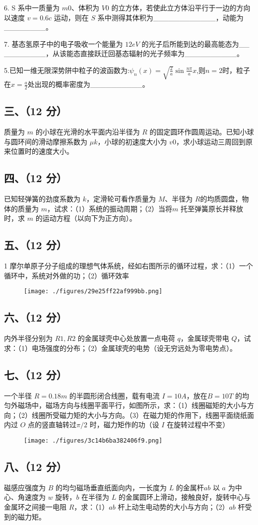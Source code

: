 6. S 系中一质量为 $m0$、体积为 $V0$ 的立方体，若使此立方体沿平行于一边的方向以速度 $v=0.6c$ 运动，则在 $S$ 系中测得其体积为____________，动能为________。

7. 基态氢原子中的电子吸收一个能量为 $12eV$ 的光子后所能到达的最高能态为__
________，从该能态直接跃迁回基态辐射的光子频率为__________。

5.已知一维无限深势阱中粒子的波函数为:$\psi_n(x)=\sqrt{\frac{2}{a}}\sin\frac{n\pi}{a}x$,则$n=2$时，粒子在$x=\frac{a}{2}$处出现的概率密度为__________。
\subsection{三、（12 分）}
质量为 $m$ 的小球在光滑的水平面内沿半径为 $R$ 的固定圆环作圆周运动。已知小球与圆环间的滑动摩擦系数为 $\mu k$，小球的初速度大小为 $v0$，求小球运动三周回到原来位置时的速度大小。
\subsection{四、（12 分）}
已知轻弹簧的劲度系数为 $k$，定滑轮可看作质量为 $M$、半径为 $R$的均质圆盘，物体的质量为 $m$，试求：（1）系统的振动周期；（2）当将$m$ 托至弹簧原长并释放时，求 $m$ 的运动方程（以向下为正方向）。
\subsection{五、（12 分）}
1 摩尔单原子分子组成的理想气体系统，经如右图所示的循环过程，求：（1）一个循环中，系统对外做的功；（2）循环效率
\begin{figure}[ht]
\centering
\texttt{[image: ./figures/29e25ff22af999bb.png]}
\caption{} \label{fig_NJU05_1}
\end{figure}
\subsection{六、（12 分）}
内外半径分别为 $R1,R2$ 的金属球壳中心处放置一点电荷 $q$，金属球壳带电 $Q$，试求：（1）电场强度的分布；（2）金属球壳的电势（设无穷远处为零电势点）。
\subsection{七、（12 分）}
一个半径 $R=0.18m$ 的半圆形闭合线圈，载有电流 $I=10A$，放在$B=10T$ 的均匀外磁场中，磁场方向与线圈平面平行，如图所示，求：（1）线圈磁矩的大小与方向；（2）线圈所受磁力矩的大小与方向。（3）在磁力矩的作用下，线圈平面绕纸面内过 $O$ 点的竖直轴转过$\pi/2$ 时，磁力矩作的功（设 $I$ 在旋转过程中不变）
\begin{figure}[ht]
\centering
\texttt{[image: ./figures/3c14b6ba382406f9.png]}
\caption{} \label{fig_NJU05_2}
\end{figure}
\subsection{八、（12 分）}
磁感应强度为 $B$ 的均匀磁场垂直纸面向内，一长度为 $L$ 的金属杆$ab$ 以 $a$ 为中心、角速度为 $w$ 旋转，$b$ 在半径为 $L$ 的金属圆环上滑动，接触良好，旋转中心与金属环之间接一电阻 $R$，求：（1）$ab$ 杆上动生电动势的大小与方向；（2）$ab$ 杆受到的磁力矩。